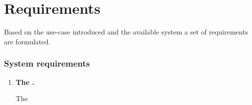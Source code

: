 \chapter{Requirements}\label{chap:requirements}
Based on the use-case introduced and the available system a set of requirements are formulated.
%
\subsection*{System requirements}
%
\begin{enumerate}
	\item \textbf{The .}
	
	The
	
\end{enumerate}

